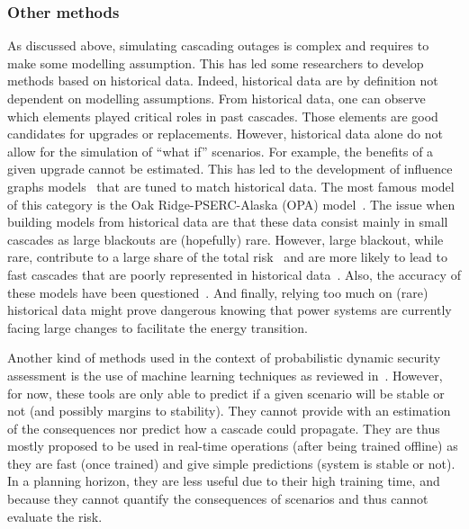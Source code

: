 
\subsubsection{Other methods}
\label{sec:OtherMethods}

As discussed above, simulating cascading outages is complex and requires to make some modelling assumption. This has led some researchers to develop methods based on historical data. Indeed, historical data are by definition not dependent on modelling assumptions. From historical data, one can observe which elements played critical roles in past cascades. Those elements are good candidates for upgrades or replacements. However, historical data alone do not allow for the simulation of ``what if'' scenarios. For example, the benefits of a given upgrade cannot be estimated. This has led to the development of influence graphs models~\cite{CascadingInfluenceGraph} that are tuned to match historical data. The most famous model of this category is the Oak Ridge-PSERC-Alaska (OPA) model~\cite{OPA2019}. The issue when building models from historical data are that these data consist mainly in small cascades as large blackouts are (hopefully) rare. However, large blackout, while rare, contribute to a large share of the total risk~\cite{CascadingMethodoAndChallenges} and are more likely to lead to fast cascades that are poorly represented in historical data~\cite{cascadeAcceleration}. Also, the accuracy of these models have been questioned~\cite{TopologicalModelsBad}. And finally, relying too much on (rare) historical data might prove dangerous knowing that power systems are currently facing large changes to facilitate the energy transition.

Another kind of methods used in the context of probabilistic dynamic security assessment is the use of machine learning techniques as reviewed in~\cite{MLEfthymios}. However, for now, these tools are only able to predict if a given scenario will be stable or not (and possibly margins to stability). They cannot provide with an estimation of the consequences nor predict how a cascade could propagate. They are thus mostly proposed to be used in real-time operations (after being trained offline) as they are fast (once trained) and give simple predictions (system is stable or not). In a planning horizon, they are less useful due to their high training time, and because they cannot quantify the consequences of scenarios and thus cannot evaluate the risk.


